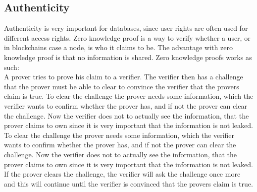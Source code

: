 \subsection{Authenticity}
Authenticity is very important for databases, since user rights are often used for different access rights. Zero knowledge proof is a way to verify whether a user, or in blockchains case a node, is who it claims to be. The advantage with zero knowledge proof is that no information is shared. Zero knowledge proofs works as such:\\
A prover tries to prove his claim to a verifier. The verifier then has a challenge that the prover must be able to clear to convince the verifier that the provers claim is true. To clear the challenge the prover needs some information, which the verifier wants to confirm whether the prover has, and if not the prover can clear the challenge. Now the verifier does not to actually see the information, that the prover claims to own since it is very important that the information is not leaked.  To clear the challenge the prover needs some information, which the verifier wants to confirm whether the prover has, and if not the prover can clear the challenge. Now the verifier does not to actually see the information, that the prover claims to own since it is very important that the information is not leaked. If the prover clears the challenge, the verifier will ask the challenge once more and this will continue until the verifier is convinced that the provers claim is true.
